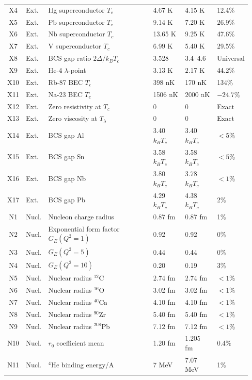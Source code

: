\begin{longtable}{@{}clp{4.2cm}p{3cm}p{3cm}l@{}}
X4  & Ext. & Hg superconductor $T_c$ & 4.67 K & 4.15 K & 12.4\% \\
X5  & Ext. & Pb superconductor $T_c$ & 9.14 K & 7.20 K & 26.9\% \\
X6  & Ext. & Nb superconductor $T_c$ & 13.65 K & 9.25 K & 47.6\% \\
X7  & Ext. & V superconductor $T_c$ & 6.99 K & 5.40 K & 29.5\% \\
X8  & Ext. & BCS gap ratio $2\Delta/k_BT_c$ & 3.528 & 3.4--4.6 & Universal \\
X9  & Ext. & He-4 $\lambda$-point & 3.13 K & 2.17 K & 44.2\% \\
X10 & Ext. & Rb-87 BEC $T_c$ & 398 nK & 170 nK & 134\% \\
X11 & Ext. & Na-23 BEC $T_c$ & 1506 nK & 2000 nK & $-24.7$\% \\
X12 & Ext. & Zero resistivity at $T_c$ & 0 & 0 & Exact \\
X13 & Ext. & Zero viscosity at $T_\lambda$ & 0 & 0 & Exact \\
X14 & Ext. & BCS gap Al & 3.40 $k_BT_c$ & 3.40 $k_BT_c$ & $<5$\% \\
X15 & Ext. & BCS gap Sn & 3.58 $k_BT_c$ & 3.58 $k_BT_c$ & $<5$\% \\
X16 & Ext. & BCS gap Nb & 3.80 $k_BT_c$ & 3.78 $k_BT_c$ & $<1$\% \\
X17 & Ext. & BCS gap Pb & 4.29 $k_BT_c$ & 4.38 $k_BT_c$ & 2\% \\
N1  & Nucl. & Nucleon charge radius & 0.87 fm & 0.87 fm & 1\% \\
N2  & Nucl. & Exponential form factor $G_E(Q^2=1)$ & 0.92 & 0.92 & 0\% \\
N3  & Nucl. & $G_E(Q^2=5)$ & 0.44 & 0.44 & 0\% \\
N4  & Nucl. & $G_E(Q^2=10)$ & 0.20 & 0.19 & 3\% \\
N5  & Nucl. & Nuclear radius $^{12}$C & 2.74 fm & 2.74 fm & $<1$\% \\
N6  & Nucl. & Nuclear radius $^{16}$O & 3.02 fm & 3.02 fm & $<1$\% \\
N7  & Nucl. & Nuclear radius $^{40}$Ca & 4.10 fm & 4.10 fm & $<1$\% \\
N8  & Nucl. & Nuclear radius $^{90}$Zr & 5.40 fm & 5.40 fm & $<1$\% \\
N9  & Nucl. & Nuclear radius $^{208}$Pb & 7.12 fm & 7.12 fm & $<1$\% \\
N10 & Nucl. & $r_0$ coefficient mean & 1.20 fm & 1.205 fm & 0.4\% \\
N11 & Nucl. & $^4$He binding energy/A & 7 MeV & 7.07 MeV & 1\% \\

\end{longtable}

